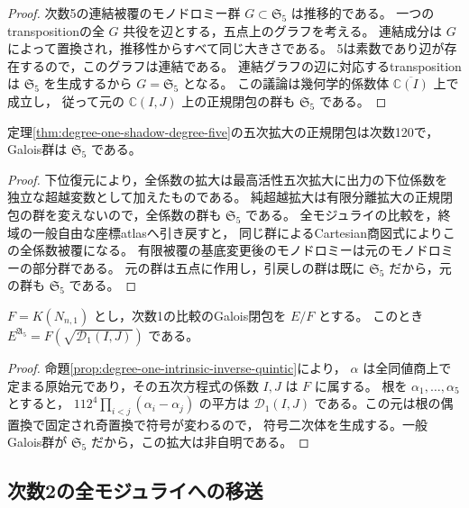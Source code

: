\begin{proof}
次数5の連結被覆のモノドロミー群 $G\subset\mathfrak S_5$ は推移的である。
一つのtranspositionの全 $G$ 共役を辺とする，五点上のグラフを考える。
連結成分は $G$ によって置換され，推移性からすべて同じ大きさである。
5は素数であり辺が存在するので，このグラフは連結である。
連結グラフの辺に対応するtranspositionは $\mathfrak S_5$ を生成するから $G=\mathfrak S_5$ となる。
この議論は幾何学的係数体 $\overline{\mathbb C(I)}$ 上で成立し，
従って元の $\mathbb C(I,J)$ 上の正規閉包の群も $\mathfrak S_5$ である。
\end{proof}

\begin{corollary}[次数1の全モジュライ比較のモノドロミー]
\label{cor:degree-one-moduli-monodromy-s5}
定理\ref{thm:degree-one-shadow-degree-five}の五次拡大の正規閉包は次数120で，
Galois群は $\mathfrak S_5$ である。
\end{corollary}
\begin{proof}
下位復元により，全係数の拡大は最高活性五次拡大に出力の下位係数を
独立な超越変数として加えたものである。
純超越拡大は有限分離拡大の正規閉包の群を変えないので，全係数の群も $\mathfrak S_5$ である。
全モジュライの比較を，終域の一般自由な座標atlasへ引き戻すと，
同じ群によるCartesian商図式によりこの全係数被覆になる。
有限被覆の基底変更後のモノドロミーは元のモノドロミーの部分群である。
元の群は五点に作用し，引戻しの群は既に $\mathfrak S_5$ だから，元の群も $\mathfrak S_5$ である。
\end{proof}

\begin{corollary}[次数1の符号二次体]
\label{cor:degree-one-monodromy-sign-field}
$F=K(N_{n,1})$ とし，次数1の比較のGalois閉包を $E/F$ とする。
このとき $E^{\mathfrak A_5}=F(\sqrt{\mathscr D_1(I,J)})$ である。
\end{corollary}
\begin{proof}
命題\ref{prop:degree-one-intrinsic-inverse-quintic}により，
$\alpha$ は全同値商上で定まる原始元であり，その五次方程式の係数 $I,J$ は $F$ に属する。
根を $\alpha_1,\ldots,\alpha_5$ とすると，
$112^4\prod_{i<j}(\alpha_i-\alpha_j)$ の平方は
$\mathscr D_1(I,J)$ である。この元は根の偶置換で固定され奇置換で符号が変わるので，
符号二次体を生成する。一般Galois群が $\mathfrak S_5$ だから，この拡大は非自明である。
\end{proof}

\subsection{次数2の全モジュライへの移送}

